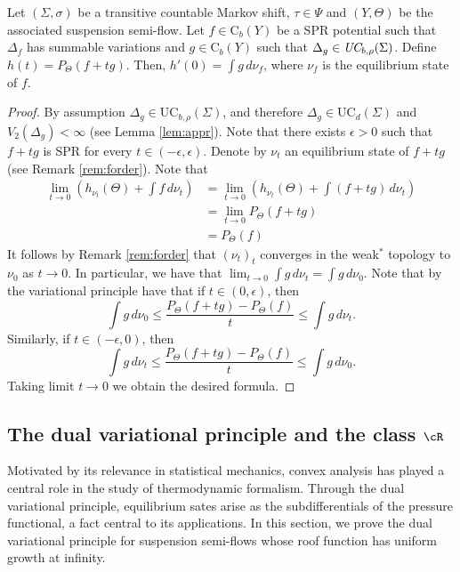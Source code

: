 \documentclass[letterpaper,11pt]{amsart}
\numberwithin{equation}{section}     %
\def\le{\leqslant}
\begin{document}
\begin{lemma}\label{lem:deri}  Let $(\Sigma,\sigma)$ be a transitive countable Markov shift, $\tau \in \Psi$ and $(Y,\Theta)$ be the associated suspension semi-flow.  Let $f\in \mathrm{C}_b(Y)$ be a SPR potential such that $\Delta_f$ has summable variations and $g\in \mathrm{C}_b(Y)$  such that $\Delta_g\in \emph{UC}_{b,\rho}(\Sigma)$. Define $h(t) =P _\Theta(f + tg)$. Then, $h'(0) = \int g \, d\nu_f$, where $\nu_f$ is the equilibrium state of $f$.
\end{lemma}

\begin{proof} By assumption $\Delta_g\in \text{UC}_{b,\rho}(\Sigma)$, and therefore $\Delta_g\in\mathrm{UC}_d(\Sigma)$ and $V_2(\Delta_g)<\infty$ (see Lemma \ref{lem:appr}). Note that there exists $\epsilon>0$ such that $f+tg$ is SPR for every $t\in (-\epsilon,\epsilon)$. Denote by $\nu_t$ an equilibrium state of $f+tg$ (see Remark \ref{rem:forder}). Note that 
\begin{align*}
\lim_{t\to 0} \left( h_{\nu_t}(\Theta)+\int f \, d\nu_t \right) &=\lim_{t\to 0} \left( h_{\nu_t}(\Theta)+\int (f+tg) \, d\nu_t \right)\\
&=\lim_{t\to 0} P_\Theta(f+tg)\\
&=P_\Theta(f)
\end{align*}
It follows by Remark \ref{rem:forder} that $(\nu_t)_t$ converges in the weak$^\ast$ topology to $\nu_0$ as $t\to 0$. In particular, we have that $\lim_{t\to0} \int g \, d\nu_t=\int g \, d\nu_0$. Note that by the variational principle have that if $t\in (0, \epsilon)$, then 
$$ \int g \, d\nu_0 \le \frac{P_\Theta(f+tg)-P_\Theta(f)}{t}\le \int g \, d\nu_t.$$
Similarly, if $t\in (-\epsilon,0)$, then 
$$ \int g \, d\nu_t \le \frac{P_\Theta(f+tg)-P_\Theta(f)}{t}\le \int g \, d\nu_0.$$
Taking limit $t\to 0$ we obtain the desired formula.
\end{proof}


\subsection{The dual variational principle and the class \texorpdfstring{$\cR$}{cR}} 
Motivated by its relevance in statistical mechanics, convex analysis has played a central role in the study of thermodynamic formalism. Through the dual variational principle, equilibrium sates arise as the subdifferentials of the pressure functional, a fact central to its applications. In this section, we prove the dual variational principle for suspension semi-flows whose roof function has uniform growth at infinity. 
\end{document}
